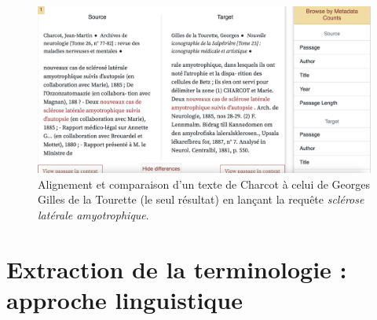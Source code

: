 \begin{figure}[!ht]
    \centering
    \includegraphics[width=1\textwidth]{img/textpair.png}
    \caption{Alignement et comparaison d'un texte de Charcot à celui de Georges Gilles de la Tourette (le seul résultat) en lançant la requête \textit{sclérose latérale amyotrophique}.}
    \label{fig:textpair}
\end{figure}

\section{Extraction de la terminologie : approche linguistique}

